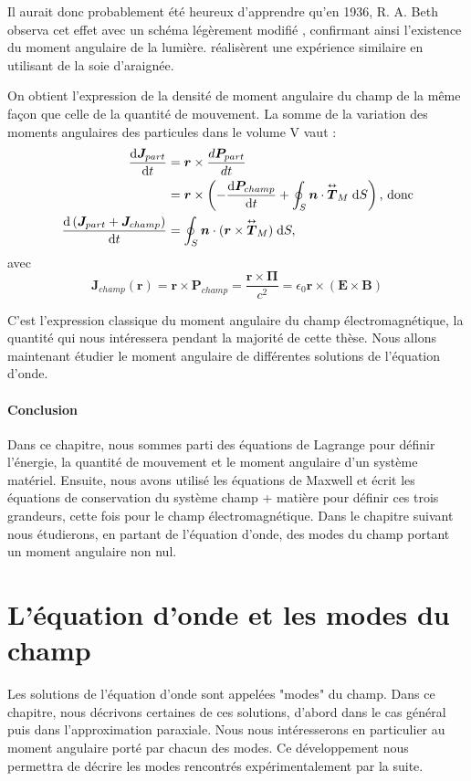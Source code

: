 Il aurait donc probablement été heureux d'apprendre qu'en 1936, R. A. Beth observa cet effet avec un schéma légèrement modifié , confirmant ainsi l'existence du moment angulaire de la lumière.  réalisèrent une expérience similaire en utilisant de la soie d'araignée.\par
On obtient l'expression de la densité de moment angulaire du champ de la même façon que celle de la quantité de mouvement. La somme de la variation des moments angulaires des particules dans le volume V vaut :
\begin{align}
\frac{\mathrm{d}\bm{J}_{part}}{\mathrm{d} t} &= \bm{r}\times\frac{d\bm{P}_{part}}{dt} \\
&= \bm{r}\times\left(-\frac{\mathrm{d} \bm{P}_{champ}}{\mathrm{d} t} + \oint_S \bm{n}\cdot\overset{\text{\tiny$\bm{\leftrightarrow}$}}{\bm{T}}_M\;\mathrm{d} S\right)\text{, donc} \\
\frac{\mathrm{d}\left(\bm{J}_{part}+\bm{J}_{champ}\right)}{\mathrm{d} t} &= \oint_S \bm{n}\cdot(\bm{r}\times\overset{\text{\tiny$\bm{\leftrightarrow}$}}{\bm{T}}_M)\;\mathrm{d} S,
\end{align}
avec
\begin{equation}
\bm{J}_{champ}(\bm{r})=\bm{r}\times{\bm{P}_{champ}}=\frac{\bm{r}\times\bm{\Pi}}{c^2} = \epsilon_0\bm{r}\times(\bm{E}\times\bm{B})
\label{Eq.DefJEM}
\end{equation}

C'est l'expression classique du moment angulaire du champ électromagnétique, la quantité qui nous intéressera pendant la majorité de cette thèse. Nous allons maintenant étudier le moment angulaire de différentes solutions de l'équation d'onde.

\subsubsection{Conclusion}
Dans ce chapitre, nous sommes parti des équations de Lagrange pour définir l'énergie, la quantité de mouvement et le moment angulaire d'un système matériel. Ensuite, nous avons utilisé les équations de Maxwell et écrit les équations de conservation du système {champ + matière} pour définir ces trois grandeurs, cette fois pour le champ électromagnétique. Dans le chapitre suivant nous étudierons, en partant de l'équation d'onde, des modes du champ portant un moment angulaire non nul.

\chapter{L'équation d'onde et les modes du champ}
\label{ch:modes}
Les solutions de l'équation d'onde sont appelées "modes" du champ. Dans ce chapitre, nous décrivons certaines de ces solutions, d'abord dans le cas général puis dans l'approximation paraxiale. Nous nous intéresserons en particulier au moment angulaire porté par chacun des modes. Ce développement nous permettra de décrire les modes rencontrés expérimentalement par la suite.
